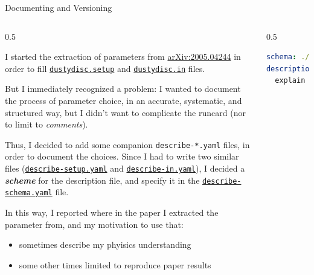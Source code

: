 \documentclass[9pt]{beamer}
\begin{document}
\begin{frame}[fragile]{Documenting and Versioning}
    \begin{columns}
        \begin{column}{0.5\textwidth}
            \vspace*{10pt}

            I started the extraction of parameters from
            \href{https://arxiv.org/abs/2005.04244}{arXiv:2005.04244} in order
            to fill
            \href{https://github.com/AleCandido/fluiddynamics_exam/blob/main/ds-tau/dustydisc.setup}{\texttt{dustydisc.setup}}
            and
            \href{https://github.com/AleCandido/fluiddynamics_exam/blob/main/ds-tau/dustydisc.in}{\texttt{dustydisc.in}}
            files.
            \vspace*{5pt}

            But I immediately recognized a problem: I wanted to document the
            process of parameter choice, in an accurate, systematic, and
            structured way, but I didn't want to complicate the runcard (nor to
            limit to \textit{comments}).
            \vspace*{5pt}

            Thus, I decided to add some companion \texttt{describe-*.yaml}
            files, in order to document the choices.
            Since I had to write two similar files
            (\href{https://github.com/AleCandido/fluiddynamics_exam/blob/main/ds-tau/describe-setup.yaml}{\texttt{describe-setup.yaml}}
            and
            \href{https://github.com/AleCandido/fluiddynamics_exam/blob/main/ds-tau/describe-in.yaml}{\texttt{describe-in.yaml}}),
            I decided a \textbf{\textit{scheme}} for the description file, and
            specify it in the
            \href{https://github.com/AleCandido/fluiddynamics_exam/blob/main/ds-tau/describe-schema.yaml}{\texttt{describe-schema.yaml}}
            file.
            \vspace*{10pt}

            In this way, I reported where in the paper I extracted the
            parameter from, and my motivation to use that:
            \begin{itemize}
                \item sometimes describe my phyisics understanding
                \item some other times limited to reproduce paper results
            \end{itemize}
        \end{column}
        \begin{column}{0.5\textwidth}
            \begin{lstlisting}[style=mystyle, language=yaml, breaklines=true, caption={
                Excerpt from the \texttt{describe-setup.yaml} file
            }]
schema: ./describe-schema.yaml
description: |
  explain parameters in 'dustydisc.setup'


\end{lstlisting}
\end{column}
\end{columns}
\end{frame}
\end{document}
